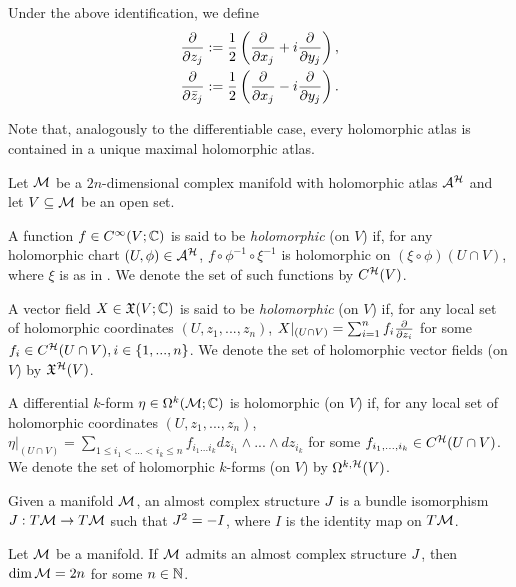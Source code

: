 \documentclass[notas.tex]{subfiles}
\begin{document}
Under the above identification, we define
\begin{align} \label{eq_holo_vecs}
	\frac{\partial }{\partial z_j} &:= \frac{1}{2} \left( \frac{\partial }{\partial x_j} + i \frac{\partial }{\partial y_j} \right), \\
	\frac{\partial }{\partial \bar{z}_j} &:= \frac{1}{2} \left( \frac{\partial }{\partial x_j} - i \frac{\partial }{\partial y_j} \right). \nonumber
\end{align}

Note that, analogously to the differentiable case, every holomorphic atlas is contained in a unique maximal holomorphic atlas.

\begin{defn} \label{def_holo}
	Let $\mathcal{M}$ be a $2n$-dimensional complex manifold with holomorphic atlas $\mathcal{A}^{\mathcal{H}}$ and let $V \subseteq \mathcal{M}$ be an open set.

	A function $f \in C^\infty(V; \mathbb{C})$ is said to be \emph{holomorphic} (on $V$) if, for any holomorphic chart $(U, \phi) \in \mathcal{A}^{\mathcal{H}}$, $f \circ \phi^{-1} \circ \xi^{-1}$ is holomorphic on $(\xi \circ \phi) (U \cap V)$, where $\xi$ is as in . We denote the set of such functions by $C^{\mathcal{H}}(V)$.

	A vector field $X \in \mathfrak{X}(V; \mathbb{C})$ is said to be \emph{holomorphic} (on $V$) if, for any local set of holomorphic coordinates $(U, z_1, ..., z_n)$, $X|_{(U \cap V)} = \sum_{i=1}^{n} f_i \frac{\partial }{\partial z_i}$ for some $f_i \in C^{\mathcal{H}}(U \cap V), i \in \{1,...,n\}$. We denote the set of holomorphic vector fields (on $V$) by $\mathfrak{X}^{\mathcal{H}}(V)$. 
	
	 A differential $k$-form $\eta \in \Omega^k(\mathcal{M}; \mathbb{C})$ is holomorphic (on $V$) if, for any local set of holomorphic coordinates $(U, z_1, ..., z_n)$, $\eta|_{(U \cap V)} = \sum_{1 \leq i_1 < ... < i_k \leq n} f_{i_1...i_k} dz_{i_1} \wedge ... \wedge  dz_{i_k}$ for some $f_{i_1,...,i_k} \in C^{\mathcal{H}}(U \cap V)$. We denote the set of holomorphic $k$-forms (on $V$) by $\Omega^{k,\mathcal{H}}(V)$.
\end{defn}

\begin{defn} \label{def_cstruct}
	Given a manifold $\mathcal{M}$, an almost complex structure $J$ is a bundle isomorphism $J: T \mathcal{M} \to T \mathcal{M}$ such that $J^2 = -I$, where $I$ is the identity map on $T \mathcal{M}$.
\end{defn}

\begin{lem}\label{lem_cstruct_even_dim}
	Let $\mathcal{M}$ be a manifold. If $\mathcal{M}$ admits an almost complex structure $J$, then $\dim \mathcal{M} = 2n$ for some $n \in \mathbb{N}$.
\end{lem}
\end{document}

